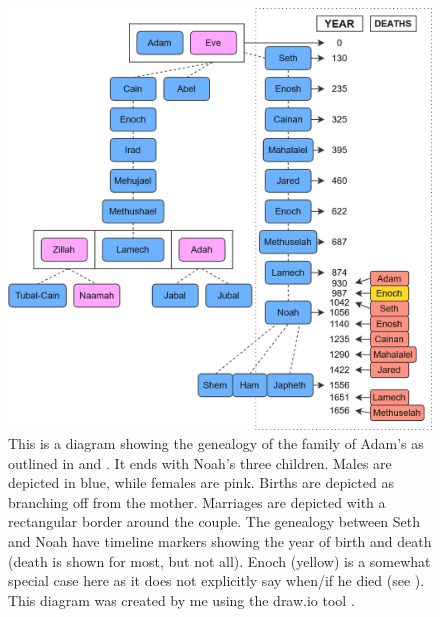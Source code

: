 \begin{figure}[htbp] %
  \centering
  \includegraphics[width=\linewidth]{images/genealogies/noahs_genealogy.png}
  \caption{This is a diagram showing the genealogy of the family of Adam's as outlined in  and . It ends with Noah's three children. Males are depicted in blue, while females are pink. Births are depicted as branching off from the mother. Marriages are depicted with a rectangular border around the couple. The genealogy between Seth and Noah have timeline markers showing the year of birth and death (death is shown for most, but not all). Enoch (yellow) is a somewhat special case here as it does not explicitly say when/if he died (see ). This diagram was created by me using the draw.io tool \cite{draw.io}.}
  \label{fig:noahs_genealogy}
\end{figure}
